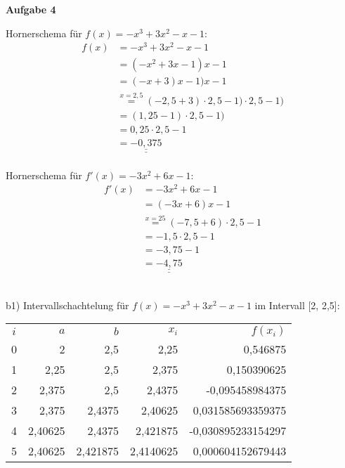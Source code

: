 \documentclass[a4paper,10pt]{article}
\begin{document}
	\newpage
	\textbf{Aufgabe 4}
	\begin{compactenum}[a)]
		\item 
		Hornerschema für $f(x) = -x^3 + 3x^2 - x - 1$:
		\begin{align*}
			f(x) & = -x^3 + 3x^2 - x - 1\\
			& = (-x^2 + 3x -1)x - 1\\
			& = (-x +3)x - 1)x - 1\\
			& \overset{x = 2,5}{=} (-2,5 + 3) \cdot 2,5 - 1) \cdot 2,5 - 1)\\
			& = (1,25 - 1) \cdot 2,5 - 1)\\
			& = 0,25 \cdot 2,5 - 1\\
			& = \underline{\underline{-0,375}}
		\end{align*}\\
		Hornerschema für $f'(x) = -3x^2 + 6x - 1$:\\
		\begin{align*}
			f'(x) & = -3x^2 + 6x - 1\\
			& = (-3x + 6)x - 1\\
			& \overset{x = 25}{=} (-7,5 + 6) \cdot 2,5 -1\\
			& = -1,5 \cdot 2,5 - 1\\
			& = -3,75 - 1\\
			& = \underline{\underline{-4,75}}
		\end{align*}
		\ \\
		\item 
		\begin{compactenum}
			\item [b1)]
			Intervallschachtelung für $f(x) = -x^3 + 3x^2 - x - 1$ im Intervall [2, 2,5]:\\
			\begin{tabular}{|crrrr|}
				\hline
				$i$ & $a$ & $b$ & $x_i$ & $f(x_i)$\\
				0 & 2 & 2,5 & 2,25 & 0,546875 \\
				1 & 2,25 & 2,5 & 2,375 & 0,150390625 \\
				2 & 2,375 & 2,5 & 2,4375 & -0,095458984375 \\
				3 & 2,375 & 2,4375 & 2,40625 & 0,031585693359375 \\
				4 & 2,40625 & 2,4375 & 2,421875 & -0,030895233154297 \\
				5 & 2,40625 & 2,421875 & 2,4140625 & 0,000604152679443 \\
				\hline
			\end{tabular}
			\\\\

\end{compactenum}
\end{compactenum}
\end{document}
